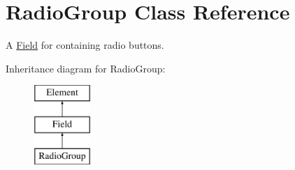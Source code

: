 \hypertarget{class_radio_group}{
\section{RadioGroup Class Reference}
\label{class_radio_group}
}


A \hyperlink{class_field}{Field} for containing radio buttons.  


Inheritance diagram for RadioGroup:\begin{figure}[H]
\begin{center}
\leavevmode
\includegraphics[height=3.000000cm]{class_radio_group}
\end{center}
\end{figure}
